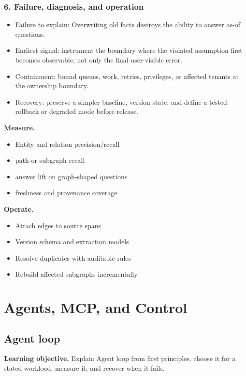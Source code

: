\subsubsection*{6. Failure, diagnosis, and operation}
\begin{itemize}
\item Failure to explain: Overwriting old facts destroys the ability to answer as-of questions.
\item Earliest signal: instrument the boundary where the violated assumption first becomes observable, not only the final user-visible error.
\item Containment: bound queues, work, retries, privileges, or affected tenants at the ownership boundary.
\item Recovery: preserve a simpler baseline, version state, and define a tested rollback or degraded mode before release.
\end{itemize}
\textbf{Measure.}\begin{itemize}
\item Entity and relation precision/recall
\item path or subgraph recall
\item answer lift on graph-shaped questions
\item freshness and provenance coverage
\end{itemize}
\textbf{Operate.}\begin{itemize}
\item Attach edges to source spans
\item Version schema and extraction models
\item Resolve duplicates with auditable rules
\item Rebuild affected subgraphs incrementally
\end{itemize}
\clearpage\section{Agents, MCP, and Control}
\subsection{Agent loop}
\textbf{Learning objective.} Explain Agent loop from first principles, choose it for a stated workload, measure it, and recover when it fails.
